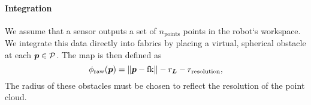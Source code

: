 \paragraph{Integration}
We assume that a sensor outputs a set of
$n_{\textrm{points}}$ points \pointcloud{} in the robot`s
workspace. We integrate this data directly into \ac{fabrics}
by placing a virtual, spherical obstacle at each $\bm{p} \in
\mathcal{P}$. The map is then defined as 
\[
  \phi_{\textrm{raw}}(\bm{p}) = \left\lVert\bm{p} - \textrm{fk}\right\rVert - r_{\bm{L}} -
  r_{\textrm{resolution}},
\]
The radius \rr{} of these obstacles must be chosen
to reflect the resolution of the point cloud.
